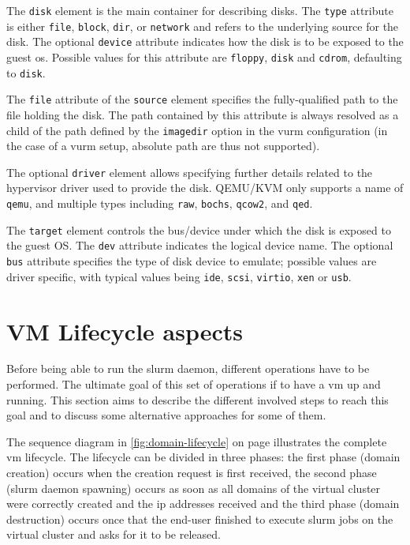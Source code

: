 The \texttt{disk} element is the main container for describing disks. The \texttt{type} attribute is either \texttt{file}, \texttt{block}, \texttt{dir}, or \texttt{network} and refers to the underlying source for the disk. The optional \texttt{device} attribute indicates how the disk is to be exposed to the guest \gls{os}. Possible values for this attribute are \texttt{floppy}, \texttt{disk} and \texttt{cdrom}, defaulting to \texttt{disk}.

The \texttt{file} attribute of the \texttt{source} element specifies the fully-qualified path to the file holding the disk. The path contained by this attribute is always resolved as a child of the path defined by the \texttt{imagedir} option in the \gls{vurm} configuration (in the case of a \gls{vurm} setup, absolute path are thus not supported).

The optional \texttt{driver} element allows specifying further details related to the hypervisor driver used to provide the disk. QEMU/KVM only supports a name of \texttt{qemu}, and multiple types including \texttt{raw}, \texttt{bochs}, \texttt{qcow2}, and \texttt{qed}.

The \texttt{target} element controls the bus/device under which the disk is exposed to the guest OS. The \texttt{dev} attribute indicates the logical device name. The optional \texttt{bus} attribute specifies the type of disk device to emulate; possible values are driver specific, with typical values being \texttt{ide}, \texttt{scsi}, \texttt{virtio}, \texttt{xen} or \texttt{usb}.



\section{VM Lifecycle aspects}
\label{sec:vm-lifecycle}

Before being able to run the \gls{slurm} daemon, different operations have to be performed. The ultimate goal of this set of operations if to have a \gls{vm} up and running. This section aims to describe the different involved steps to reach this goal and to discuss some alternative approaches for some of them.

The sequence diagram in \autoref{fig:domain-lifecycle} on page \pageref{fig:domain-lifecycle} illustrates the complete \gls{vm} lifecycle. The lifecycle can be divided in three phases: the first phase (domain creation) occurs when the creation request is first received, the second phase (\gls{slurm} daemon spawning) occurs as soon as all domains of the virtual cluster were correctly created and the \gls{ip} addresses received and the third phase (domain destruction) occurs once that the end-user finished to execute \gls{slurm} jobs on the virtual cluster and asks for it to be released.


